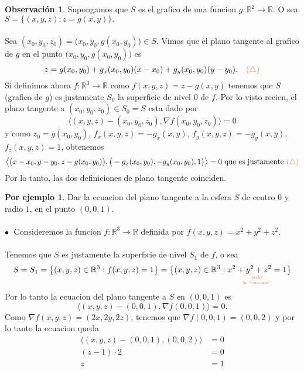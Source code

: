\documentclass{article}
\theoremstyle{definition}
\theoremstyle{definition}
\newtheorem*{obs}{Observación}
\newtheorem*{ej}{Por ejemplo}
\theoremstyle{remark}
\newcommand\bl{$\bullet\;$}
\begin{document}
  \begin{figure}[h]
\centering
\def\svgwidth{0.65\textwidth}
\makebox[\textwidth]{
}
\end{figure} 
\begin{obs}
  Supongamos que $S$ es el grafico de una funcion $g : \mathbb{R}^2 \to \mathbb{R}$. O sea $S=\big\{(x,y,z) : z=g(x,y)\big\}.$ \\\\ Sea $(x_0,y_0,z_0)=\big(x_0,y_0,g(x_0,y_0)\big) \in S$. Vimos que el plano tangente al grafico de $g$ en el punto $\big(x_0,y_0,g(x_0,y_0)\big)$ es \[
    z=g(x_0,y_0)+g_x(x_0,y_0)(x-x_0)+g_y(x_0,y_0)(y-y_0). \quad \textcolor{rojop2}{(\triangle)}
    \] Si definimos ahora $f : \mathbb{R}^3 \to \mathbb{R}$ como $f(x,y,z)=z-g(x,y)$ tenemos que $S$ (grafico de $g$) es justamente $S_0$ la superficie de nivel $0$ de $f$. Por lo visto recien, el plano tangente a $(x_0,y_0,z_0) \in S_0=S$ esta dado por \[
\big\langle (x,y,z)-(x_0,y_0,z_0),\nabla f(x_0,y_0,z_0) \big\rangle =0
\]y como $z_0=g(x_0,y_0)$, $f_x(x,y,z)=-g_x(x,y)$, \mbox{$f_y(x,y,z)=-g_y(x,y)$}, \mbox{$f_z(x,y,z)=1$,} obtenemos \[
\big\langle \big(x-x_0,y-y_0,z-g(x_0,y_0)\big),\big(-g_x(x_0,y_0),-g_y(x_0,y_0),1\big) \big\rangle =0 \text{ que es justamente }\textcolor{rojop2}{(\triangle)}
\] Por lo tanto, las dos definiciones de plano tangente coinciden.
\end{obs}
\begin{ej}
  Dar la ecuacion del plano tangente a la esfera $S$ de centro $0$ y radio $1$, en el punto $(0,0,1)$. \\\\
  \textcolor{rojop2}{\bl} Consideremos la funcion $f : \mathbb{R}^3 \to \mathbb{R}$ definida por $f(x,y,z)=x^2+y^2+z^2$.\\\\ Tenemos que $S$ es justamente la superficie de nivel $S_1$ de $f$, o sea \[
    S=S_1=\big\{(x,y,z) \in \mathbb{R}^3 : f(x,y,z)=1\big\}=\big\{(x,y,z) \in \mathbb{R}^3 : \underset{\underset{\textcolor{rojop2}{\text{la ``cascara''}}}{\textcolor{rojop2}{\text{solo}}}}{x^2+y^2+z^2 = 1}\big\}
    \]Por lo tanto la ecuacion del plano tangente a $S$ en $(0,0,1)$ es \[
\big\langle (x,y,z)-(0,0,1),\nabla f(0,0,1) \big\rangle = 0.
\] Como $\nabla f(x,y,z)=(2x,2y,2z)$, tenemos que $\nabla f (0,0,1)=(0,0,2)$ y por lo tanto la ecuacion queda \[
\begin{aligned}
  \big\langle (x,y,z) - (0,0,1),(0,0,2)\big\rangle & = 0 \\
  (z-1)\cdot 2 & = 0 \\
  z & = 1
\end{aligned}
\]
\end{ej} \; 
\end{document}
